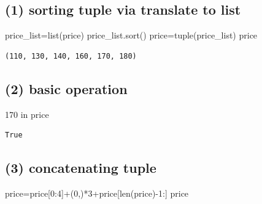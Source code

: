 \documentclass[
  letterpaper,
  DIV=11,
  numbers=noendperiod]{scrreprt}
\newenvironment{Shaded}{\begin{snugshade}}{\end{snugshade}}
\newcommand{\BuiltInTok}[1]{\textcolor[rgb]{0.00,0.23,0.31}{#1}}
\newcommand{\DecValTok}[1]{\textcolor[rgb]{0.68,0.00,0.00}{#1}}
\newcommand{\KeywordTok}[1]{\textcolor[rgb]{0.00,0.23,0.31}{#1}}
\newcommand{\NormalTok}[1]{\textcolor[rgb]{0.00,0.23,0.31}{#1}}
\newcommand{\OperatorTok}[1]{\textcolor[rgb]{0.37,0.37,0.37}{#1}}
\begin{document}
\subsection*{(1) sorting tuple via translate to
list}\label{sorting-tuple-via-translate-to-list}

\begin{Shaded}
\begin{Highlighting}[]
\NormalTok{price\_list}\OperatorTok{=}\BuiltInTok{list}\NormalTok{(price)}
\NormalTok{price\_list.sort()}
\NormalTok{price}\OperatorTok{=}\BuiltInTok{tuple}\NormalTok{(price\_list)}
\NormalTok{price}
\end{Highlighting}
\end{Shaded}

\begin{verbatim}
(110, 130, 140, 160, 170, 180)
\end{verbatim}

\subsection*{(2) basic operation}\label{basic-operation}

\begin{Shaded}
\begin{Highlighting}[]
\DecValTok{170} \KeywordTok{in}\NormalTok{ price}
\end{Highlighting}
\end{Shaded}

\begin{verbatim}
True
\end{verbatim}

\subsection*{(3) concatenating tuple}\label{concatenating-tuple}

\begin{Shaded}
\begin{Highlighting}[]
\NormalTok{price}\OperatorTok{=}\NormalTok{price[}\DecValTok{0}\NormalTok{:}\DecValTok{4}\NormalTok{]}\OperatorTok{+}\NormalTok{(}\DecValTok{0}\NormalTok{,)}\OperatorTok{*}\DecValTok{3}\OperatorTok{+}\NormalTok{price[}\BuiltInTok{len}\NormalTok{(price)}\OperatorTok{{-}}\DecValTok{1}\NormalTok{:]}
\NormalTok{price}
\end{Highlighting}
\end{Shaded}
\end{document}
